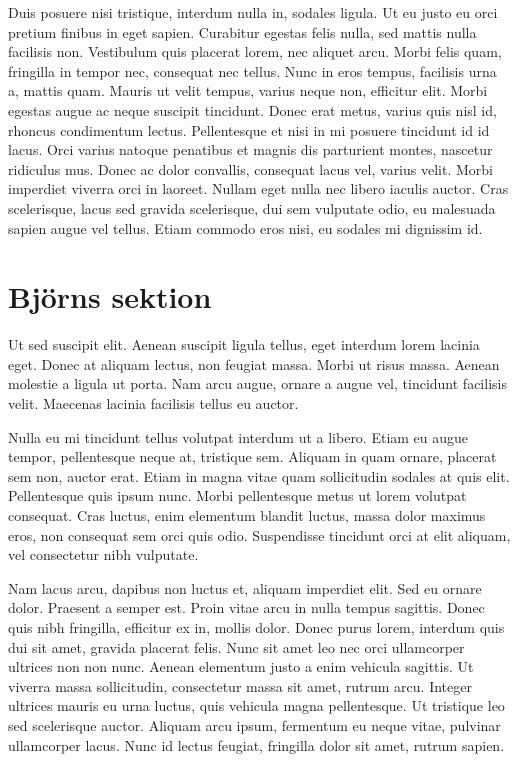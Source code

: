 \documentclass[a4paper,10pt]{article}
\begin{document}
Duis posuere nisi tristique, interdum nulla in, sodales ligula. Ut eu justo eu orci pretium finibus in eget sapien. Curabitur egestas felis nulla, sed mattis nulla facilisis non. Vestibulum quis placerat lorem, nec aliquet arcu. Morbi felis quam, fringilla in tempor nec, consequat nec tellus. Nunc in eros tempus, facilisis urna a, mattis quam. Mauris ut velit tempus, varius neque non, efficitur elit. Morbi egestas augue ac neque suscipit tincidunt. Donec erat metus, varius quis nisl id, rhoncus condimentum lectus. Pellentesque et nisi in mi posuere tincidunt id id lacus. Orci varius natoque penatibus et magnis dis parturient montes, nascetur ridiculus mus. Donec ac dolor convallis, consequat lacus vel, varius velit. Morbi imperdiet viverra orci in laoreet. Nullam eget nulla nec libero iaculis auctor. Cras scelerisque, lacus sed gravida scelerisque, dui sem vulputate odio, eu malesuada sapien augue vel tellus. Etiam commodo eros nisi, eu sodales mi dignissim id.

\section{Björns sektion}
Ut sed suscipit elit. Aenean suscipit ligula tellus, eget interdum lorem lacinia eget. Donec at aliquam lectus, non feugiat massa. Morbi ut risus massa. Aenean molestie a ligula ut porta. Nam arcu augue, ornare a augue vel, tincidunt facilisis velit. Maecenas lacinia facilisis tellus eu auctor.

Nulla eu mi tincidunt tellus volutpat interdum ut a libero. Etiam eu augue tempor, pellentesque neque at, tristique sem. Aliquam in quam ornare, placerat sem non, auctor erat. Etiam in magna vitae quam sollicitudin sodales at quis elit. Pellentesque quis ipsum nunc. Morbi pellentesque metus ut lorem volutpat consequat. Cras luctus, enim elementum blandit luctus, massa dolor maximus eros, non consequat sem orci quis odio. Suspendisse tincidunt orci at elit aliquam, vel consectetur nibh vulputate.

Nam lacus arcu, dapibus non luctus et, aliquam imperdiet elit. Sed eu ornare dolor. Praesent a semper est. Proin vitae arcu in nulla tempus sagittis. Donec quis nibh fringilla, efficitur ex in, mollis dolor. Donec purus lorem, interdum quis dui sit amet, gravida placerat felis. Nunc sit amet leo nec orci ullamcorper ultrices non non nunc. Aenean elementum justo a enim vehicula sagittis. Ut viverra massa sollicitudin, consectetur massa sit amet, rutrum arcu. Integer ultrices mauris eu urna luctus, quis vehicula magna pellentesque. Ut tristique leo sed scelerisque auctor. Aliquam arcu ipsum, fermentum eu neque vitae, pulvinar ullamcorper lacus. Nunc id lectus feugiat, fringilla dolor sit amet, rutrum sapien.
\end{document}
